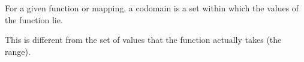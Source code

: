 For a given function or mapping, a codomain is a set within which the
values of the function lie.
\par
This is different from the set of values that the function actually takes 
(the range).